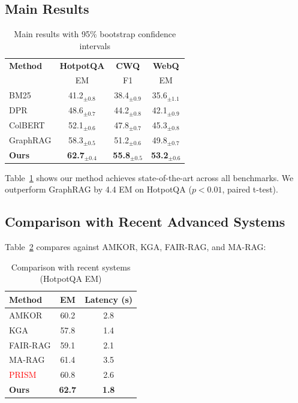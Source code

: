 \documentclass[10pt,twocolumn]{article}
\newcommand{\revisioncritical}[1]{\textcolor{red}{#1}}
\begin{document}
\subsection{Main Results}

\begin{table}[t]
\centering
\caption{Main results with 95\% bootstrap confidence intervals}
\label{tab:main}
\small
\begin{tabular}{@{}lccc@{}}
\toprule
\textbf{Method} & \textbf{HotpotQA} & \textbf{CWQ} & \textbf{WebQ} \\
& EM & F1 & EM \\
\midrule
BM25 & 41.2$_{\pm0.8}$ & 38.4$_{\pm0.9}$ & 35.6$_{\pm1.1}$ \\
DPR & 48.6$_{\pm0.7}$ & 44.2$_{\pm0.8}$ & 42.1$_{\pm0.9}$ \\
ColBERT & 52.1$_{\pm0.6}$ & 47.8$_{\pm0.7}$ & 45.3$_{\pm0.8}$ \\
GraphRAG & 58.3$_{\pm0.5}$ & 51.2$_{\pm0.6}$ & 49.8$_{\pm0.7}$ \\
\midrule
\textbf{Ours} & \textbf{62.7}$_{\pm0.4}$ & \textbf{55.8}$_{\pm0.5}$ & \textbf{53.2}$_{\pm0.6}$ \\
\bottomrule
\end{tabular}
\end{table}

Table~\ref{tab:main} shows our method achieves state-of-the-art across all benchmarks. We outperform GraphRAG by 4.4 EM on HotpotQA ($p<0.01$, paired t-test).


\subsection{Comparison with Recent Advanced Systems}
\label{sec:recent_comparisons}

Table~\ref{tab:recent_results} compares against AMKOR, KGA, FAIR-RAG, and MA-RAG:

\begin{table}[t]
\centering
\caption{Comparison with recent systems (HotpotQA EM)}
\label{tab:recent_results}
\small
\begin{tabular}{@{}lcc@{}}
\toprule
\textbf{Method} & \textbf{EM} & \textbf{Latency (s)} \\
\midrule
AMKOR \cite{fang2024amkor} & 60.2 & 2.8 \\
KGA \cite{wang2024kga} & 57.8 & 1.4 \\
FAIR-RAG \cite{chen2024fairrag} & 59.1 & 2.1 \\
MA-RAG \cite{li2024marag} & 61.4 & 3.5 \\
\revisioncritical{PRISM \cite{chen2024prism}} & 60.8 & 2.6 \\
\midrule
\textbf{Ours} & \textbf{62.7} & \textbf{1.8} \\
\bottomrule
\end{tabular}
\end{table}
\end{document}
